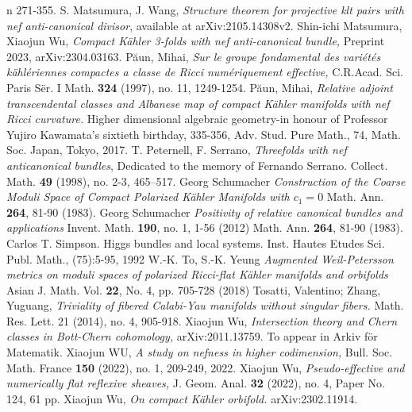 \documentclass[a4, 12pt]{amsart}
\numberwithin{equation}{section}
\theoremstyle{definition}
\begin{document}
\begin{thebibliography}{n}
271-355.
  S. Matsumura, J. Wang,  
\textit{Structure theorem for projective klt pairs with nef anti-canonical divisor}, 
available at  arXiv:2105.14308v2. 
Shin-ichi Matsumura, Xiaojun Wu,
{\em Compact K\"ahler 3-folds with nef anti-canonical bundle,} 
Preprint 2023, 	arXiv:2304.03163.
P\u{a}un, Mihai, {\em Sur le groupe fondamental des vari\'et\'es k\"ahl\'eriennes compactes a classe de Ricci num\'eriquement effective,} C.R.Acad. Sci. Paris S\"er. I Math. {\bf{324}} (1997), no. 11, 1249-1254. 
P\u{a}un, Mihai,{\em
Relative adjoint transcendental classes and Albanese map of compact K\"ahler manifolds with nef Ricci curvature.} Higher dimensional algebraic geometry-in honour of Professor Yujiro Kawamata's sixtieth birthday, 335-356,
Adv. Stud. Pure Math., 74, Math. Soc. Japan, Tokyo, 2017. 
T. Peternell, F. Serrano, 
\textit{Threefolds with nef anticanonical bundles}, 
Dedicated to the memory of Fernando Serrano. Collect. Math. {\bf{49}} (1998), no. 2-3, 465--517. 
Georg Schumacher
\textit{Construction of the Coarse Moduli Space of Compact Polarized K\"ahler Manifolds with $c_1=0$}
Math. Ann. \textbf{264}, 81-90 (1983).
Georg Schumacher
\textit{Positivity of relative canonical bundles and applications}
Invent. Math. \textbf{190}, no. 1, 1-56 (2012)
Math. Ann. \textbf{264}, 81-90 (1983).
Carlos T. Simpson. Higgs bundles and local systems. Inst. Hautes Etudes Sci. Publ.
Math., (75):5-95, 1992
W.-K. To, S.-K. Yeung
\textit{Augmented Weil-Petersson metrics on moduli spaces of polarized Ricci-flat K\"ahler manifolds and orbifolds}
Asian J. Math. Vol. \textbf{22}, No. 4, pp. 705-728 (2018)
Tosatti, Valentino; Zhang, Yuguang,
{\em 
Triviality of fibered Calabi-Yau manifolds without singular fibers. }
Math. Res. Lett. 21 (2014), no. 4, 905-918. 
Xiaojun Wu,
{\em Intersection theory and Chern classes in Bott-Chern cohomology,} arXiv:2011.13759. To appear in  Arkiv f\"or Matematik.
Xiaojun WU,
{\em A study on nefness in higher codimension,}  Bull. Soc. Math. France {\bf{150}} (2022), no. 1, 209-249, 2022.
Xiaojun Wu,
{\em Pseudo-effective and numerically flat reflexive sheaves,}  J. Geom. Anal. {\bf{32}} (2022), no. 4, Paper No. 124, 61 pp.
Xiaojun Wu, {\em
 On compact K\"ahler orbifold.} arXiv:2302.11914.
\end{thebibliography} 
\end{document}
